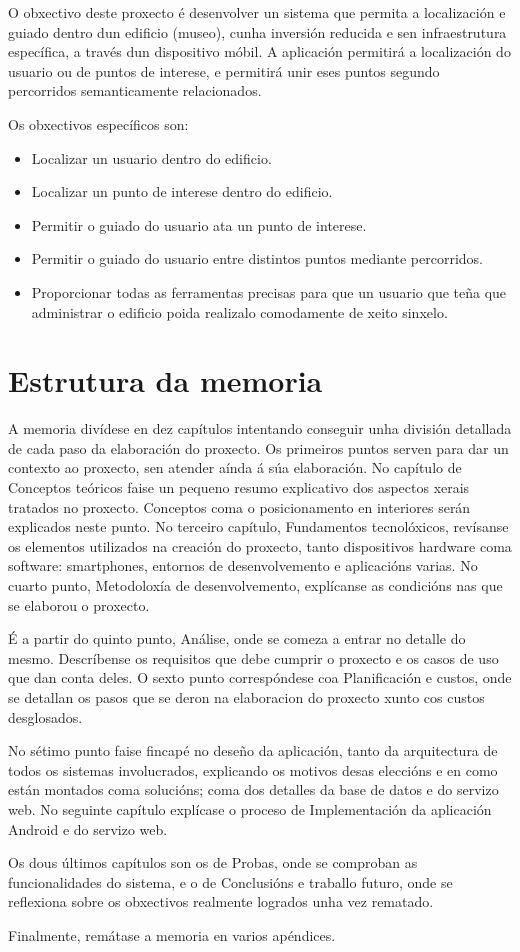 O obxectivo deste proxecto é desenvolver un sistema que permita a localización e guiado dentro dun edificio (museo), cunha inversión reducida e sen infraestrutura específica, a través dun dispositivo móbil. A aplicación permitirá a localización do usuario ou de puntos de interese, e permitirá unir eses puntos segundo percorridos semanticamente relacionados.

Os obxectivos específicos son:
\begin{itemize}
	\item Localizar un usuario dentro do edificio.
	\item Localizar un punto de interese dentro do edificio.
	\item Permitir o guiado do usuario ata un punto de interese.
	\item Permitir o guiado do usuario entre distintos puntos mediante percorridos.
	\item Proporcionar todas as ferramentas precisas para que un usuario que teña que administrar o edificio poida realizalo comodamente de xeito sinxelo.
\end{itemize}

\section{Estrutura da memoria}

A memoria divídese en dez capítulos intentando conseguir unha división detallada de cada paso da elaboración do proxecto. Os primeiros puntos serven para dar un contexto ao proxecto, sen atender aínda á súa elaboración. No capítulo de Conceptos teóricos faise un pequeno resumo explicativo dos aspectos xerais tratados no proxecto. Conceptos coma o posicionamento en interiores serán explicados neste punto. No terceiro capítulo, Fundamentos tecnolóxicos, revísanse os elementos utilizados na creación do proxecto, tanto dispositivos hardware coma software: smartphones, entornos de desenvolvemento e aplicacións varias. No cuarto punto, Metodoloxía de desenvolvemento, explícanse as condicións nas que se elaborou o proxecto.

É a partir do quinto punto, Análise, onde se comeza a entrar no detalle do mesmo. Descríbense os requisitos que debe cumprir o proxecto e os casos de uso que dan conta deles. O sexto punto correspóndese coa Planificación e custos, onde se detallan os pasos que se deron na elaboracion do proxecto xunto cos custos desglosados.

No sétimo punto faise fincapé no deseño da aplicación, tanto da arquitectura de todos os sistemas involucrados, explicando os motivos desas eleccións e en como están montados coma solucións; coma dos detalles da base de datos e do servizo web.
No seguinte capítulo explícase o proceso de Implementación da aplicación Android e do servizo web.

Os dous últimos capítulos son os de Probas, onde se comproban as funcionalidades do sistema, e o de Conclusións e traballo futuro, onde se reflexiona sobre os obxectivos realmente logrados unha vez rematado.

Finalmente, remátase a memoria en varios apéndices.
